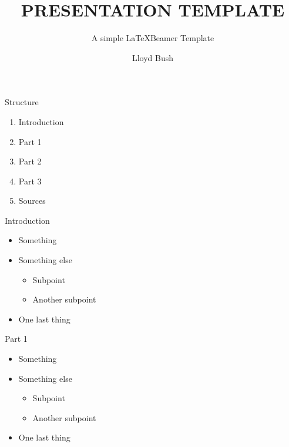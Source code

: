 \documentclass[aspectratio=169]{beamer}
\title{PRESENTATION TEMPLATE}
\subtitle{A simple \LaTeX Beamer Template}
\author{Lloyd Bush}
\institute{Gymnasium Dresden-Bühlau}
\date{}
\begin{document}
    \begin{frame}
        \titlepage
    \end{frame}

    \begin{frame}{Structure}
        \begin{enumerate}
            \pause
            \item Introduction
            \pause
            \item Part 1
            \pause
            \item Part 2
            \pause
            \item Part 3
            \pause
            \item Sources
        \end{enumerate}
    \end{frame}

    \begin{frame}{Introduction}
        \begin{itemize}
            \pause
            \item Something
            \pause
            \item Something else
            \begin{itemize}
                \item Subpoint
                \item Another subpoint
            \end{itemize}
            \pause
            \item One last thing
        \end{itemize}
    \end{frame}

    \begin{frame}{Part 1}
        \begin{itemize}
            \pause
            \item Something
            \pause
            \item Something else
            \begin{itemize}
                \item Subpoint
                \item Another subpoint
            \end{itemize}
            \pause
            \item One last thing
        \end{itemize}
    \end{frame}
\end{document}
